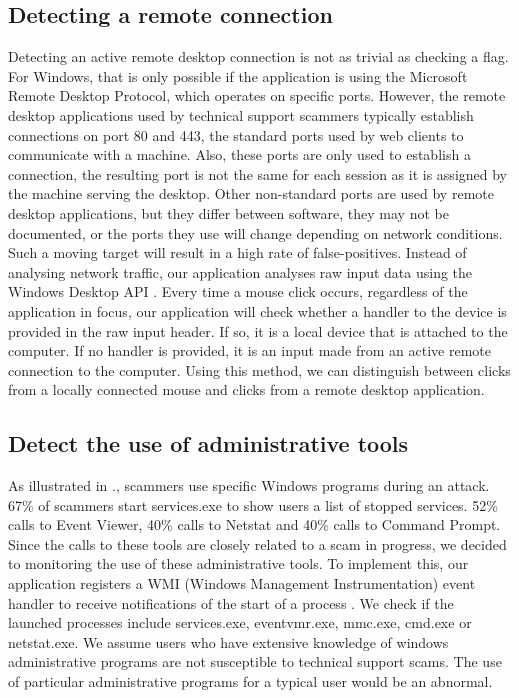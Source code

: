 \documentclass[final]{IEEEtran}
\begin{document}
\subsection{Detecting a remote connection}
Detecting an active remote desktop connection is not as trivial as checking a flag. For Windows, that is only possible if the application is using the Microsoft Remote Desktop Protocol, which operates on specific ports. However, the remote desktop applications used by technical support scammers typically establish connections on port 80 and 443, the standard ports used by web clients to communicate with a machine. Also, these ports are only used to establish a connection, the resulting port is not the same for each session as it is assigned by the machine serving the desktop. Other non-standard ports are used by remote desktop applications, but they differ between software, they may not be documented, or the ports they use will change depending on network conditions. Such a moving target will result in a high rate of false-positives. Instead of analysing network traffic, our application analyses raw input data using the Windows Desktop API \cite {b4}. Every time a mouse click occurs, regardless of the application in focus, our application will check whether a handler to the device is provided in the raw input header. If so, it is a local device that is attached to the computer. If no handler is provided, it is an input made from an active remote connection to the computer. Using this method, we can distinguish between clicks from a locally connected mouse and clicks from a remote desktop application.

\subsection{Detect the use of administrative tools}
As illustrated in \cite[Fig 2]{b2}., scammers use specific Windows programs during an attack. 67\% of scammers start services.exe to show users a list of stopped services. 52\% calls to Event Viewer, 40\% calls to Netstat and 40\% calls to Command Prompt. Since the calls to these tools are closely related to a scam in progress, we decided to monitoring the use of these administrative tools. To implement this, our application registers a WMI (Windows Management Instrumentation) event handler to receive notifications of the start of a process \cite{b9}. We check if the launched processes include services.exe, eventvmr.exe, mmc.exe, cmd.exe or netstat.exe. We assume users who have extensive knowledge of windows administrative programs are not susceptible to technical support scams. The use of particular administrative programs for a typical user would be an abnormal. 
\end{document}

